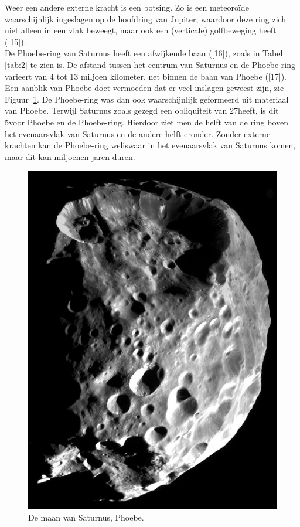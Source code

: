 \documentclass[a4paper]{article}
\begin{document}
\noindent
	Weer een andere externe kracht is een botsing. Zo is een meteoro\"ide waarschijnlijk ingeslagen op de hoofdring van Jupiter, waardoor deze ring zich niet alleen in een vlak beweegt, maar ook een (verticale) golfbeweging heeft ([15]).\\
	
\noindent
	De Phoebe-ring van Saturnus heeft een afwijkende baan ([16]), zoals in Tabel \ref{tab:2} te zien is. De afstand tussen het centrum van Saturnus en de Phoebe-ring varieert van 4 tot 13 miljoen kilometer, net binnen de baan van Phoebe ([17]). Een aanblik van Phoebe doet vermoeden dat er veel inslagen geweest zijn, zie Figuur~\ref{fig:Phoebe}. De Phoebe-ring was dan ook waarschijnlijk geformeerd uit materiaal van Phoebe. Terwijl Saturnus zoals gezegd een obliquiteit van 27\degree heeft, is dit 5\degree voor Phoebe en de Phoebe-ring. Hierdoor ziet men de helft van de ring boven het evenaarsvlak van Saturnus en de andere helft eronder. Zonder externe krachten kan de Phoebe-ring weliswaar in het evenaarsvlak van Saturnus komen, maar dit kan miljoenen jaren duren.
	\begin{figure}[h]
		\centering 
		\includegraphics[scale=0.21]{img/Phoebe.jpg}
		\caption{De maan van Saturnus, Phoebe.}
		\label{fig:Phoebe} 
	\end{figure}
	\newpage
\end{document}
